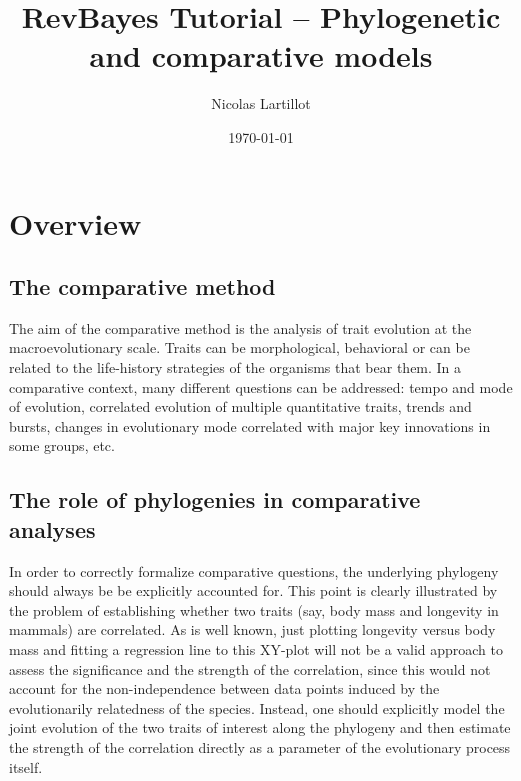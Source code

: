 \documentclass[11pt, oneside]{article}   	%
\title{RevBayes Tutorial -- Phylogenetic and comparative models}
\author{Nicolas Lartillot}
\date{\today}							%
\begin{document}
\maketitle

\section{Overview}

\subsection{The comparative method}

The aim of the comparative method is the analysis of trait evolution at the macroevolutionary scale.
Traits can be morphological, behavioral or can be related to the life-history strategies of the organisms that bear them.
In a comparative context, many different questions can be addressed: tempo and mode of evolution, correlated evolution of multiple quantitative traits, trends and bursts, changes in evolutionary mode correlated with major key innovations in some groups, etc.

\subsection{The role of phylogenies in comparative analyses}

In order to correctly formalize comparative questions, the underlying phylogeny should always be be explicitly accounted for. This point is clearly illustrated by the problem of establishing whether two traits (say, body mass and longevity in mammals) are correlated.
As is well known, just plotting longevity versus body mass and fitting a regression line to this XY-plot will not be a valid approach to assess the significance and the strength of the correlation, since this would not account for the non-independence between data points induced by the evolutionarily relatedness of the species.
Instead, one should explicitly model the joint evolution of the two traits of interest along the phylogeny and then estimate the strength of the correlation directly as a parameter of the evolutionary process itself.
\end{document}
